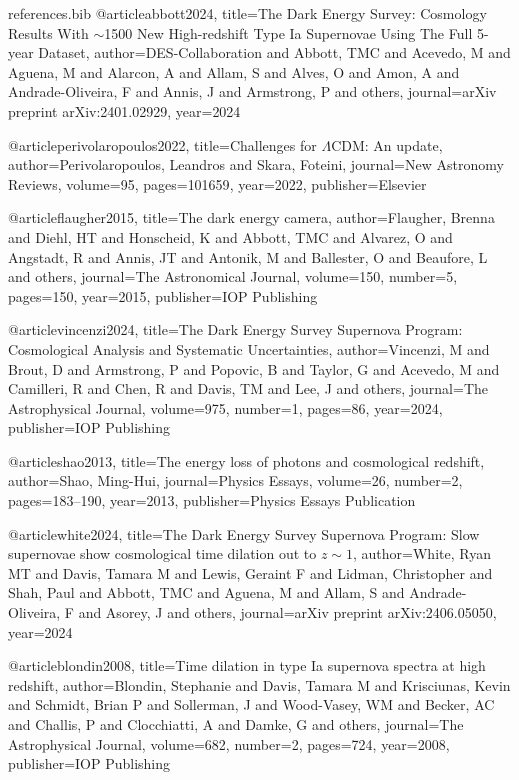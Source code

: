 \begin{filecontents}{references.bib}
@article{abbott2024,
  title={The Dark Energy Survey: Cosmology Results With $\sim$1500 New High-redshift Type Ia Supernovae Using The Full 5-year Dataset},
  author={DES-Collaboration and Abbott, TMC and Acevedo, M and Aguena, M and Alarcon, A and Allam, S and Alves, O and Amon, A and Andrade-Oliveira, F and Annis, J and Armstrong, P and others},
  journal={arXiv preprint arXiv:2401.02929},
  year={2024}
}

@article{perivolaropoulos2022,
  title={Challenges for $\Lambda$CDM: An update},
  author={Perivolaropoulos, Leandros and Skara, Foteini},
  journal={New Astronomy Reviews},
  volume={95},
  pages={101659},
  year={2022},
  publisher={Elsevier}
}

@article{flaugher2015,
  title={The dark energy camera},
  author={Flaugher, Brenna and Diehl, HT and Honscheid, K and Abbott, TMC and Alvarez, O and Angstadt, R and Annis, JT and Antonik, M and Ballester, O and Beaufore, L and others},
  journal={The Astronomical Journal},
  volume={150},
  number={5},
  pages={150},
  year={2015},
  publisher={IOP Publishing}
}

@article{vincenzi2024,
  title={The Dark Energy Survey Supernova Program: Cosmological Analysis and Systematic Uncertainties},
  author={Vincenzi, M and Brout, D and Armstrong, P and Popovic, B and Taylor, G and Acevedo, M and Camilleri, R and Chen, R and Davis, TM and Lee, J and others},
  journal={The Astrophysical Journal},
  volume={975},
  number={1},
  pages={86},
  year={2024},
  publisher={IOP Publishing}
}

@article{shao2013,
  title={The energy loss of photons and cosmological redshift},
  author={Shao, Ming-Hui},
  journal={Physics Essays},
  volume={26},
  number={2},
  pages={183--190},
  year={2013},
  publisher={Physics Essays Publication}
}

@article{white2024,
  title={The Dark Energy Survey Supernova Program: Slow supernovae show cosmological time dilation out to $ z \sim 1$},
  author={White, Ryan MT and Davis, Tamara M and Lewis, Geraint F and Lidman, Christopher and Shah, Paul and Abbott, TMC and Aguena, M and Allam, S and Andrade-Oliveira, F and Asorey, J and others},
  journal={arXiv preprint arXiv:2406.05050},
  year={2024}
}

@article{blondin2008,
  title={Time dilation in type Ia supernova spectra at high redshift},
  author={Blondin, Stephanie and Davis, Tamara M and Krisciunas, Kevin and Schmidt, Brian P and Sollerman, J and Wood-Vasey, WM and Becker, AC and Challis, P and Clocchiatti, A and Damke, G and others},
  journal={The Astrophysical Journal},
  volume={682},
  number={2},
  pages={724},
  year={2008},
  publisher={IOP Publishing}
}


\end{filecontents}
